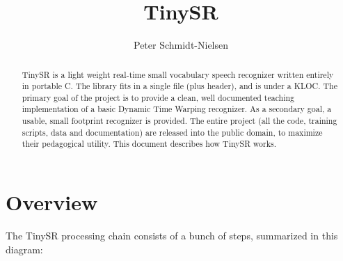 \documentclass{article}
\title{TinySR}
\author{Peter Schmidt-Nielsen}
\begin{document}
\maketitle
\begin{abstract}
TinySR is a light weight real-time small vocabulary speech recognizer written entirely in portable C.
The library fits in a single file (plus header), and is under a KLOC.
The primary goal of the project is to provide a clean, well documented teaching implementation of a basic Dynamic Time Warping recognizer.
As a secondary goal, a usable, small footprint recognizer is provided.
The entire project (all the code, training scripts, data and documentation) are released into the public domain, to maximize their pedagogical utility.
This document describes how TinySR works.
\end{abstract}
\section{Overview}
The TinySR processing chain consists of a bunch of steps, summarized in this diagram:
\end{document}

